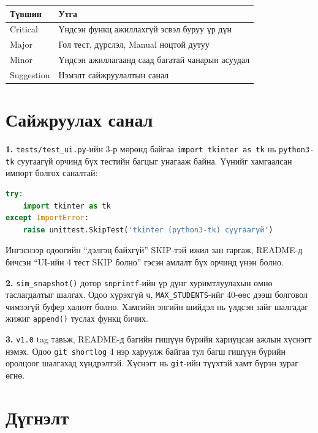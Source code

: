 \documentclass[11pt,a4paper]{article}
\begin{document}
\begin{center}
\small
\begin{tabular}{lL{11.0cm}}
\toprule
Түвшин & Утга \\
\midrule
Critical & Үндсэн функц ажиллахгүй эсвэл буруу үр дүн \\
Major & Гол тест, дүрслэл, Manual ноцтой дутуу \\
Minor & Үндсэн ажиллагаанд саад багатай чанарын асуудал \\
Suggestion & Нэмэлт сайжруулалтын санал \\
\bottomrule
\end{tabular}
\end{center}

\section{Сайжруулах санал}

\textbf{1.} \texttt{tests/test\_ui.py}-ийн 3-р мөрөнд байгаа
\texttt{import tkinter as tk} нь \texttt{python3-tk} суугаагүй орчинд бүх
тестийн багцыг унагааж байна. Үүнийг хамгаалсан импорт болгох саналтай:

\begin{lstlisting}[language=Python]
try:
    import tkinter as tk
except ImportError:
    raise unittest.SkipTest('tkinter (python3-tk) суугаагүй')
\end{lstlisting}

Ингэснээр одоогийн ``дэлгэц байхгүй'' SKIP-тэй ижил зан гаргаж, README-д
бичсэн ``UI-ийн 4 тест SKIP болно'' гэсэн амлалт бүх орчинд үнэн болно.

\vspace{3mm}\textbf{2.} \texttt{sim\_snapshot()} дотор \texttt{snprintf}-ийн
үр дүнг хуримтлуулахын өмнө таслагдалтыг шалгах. Одоо хүрэхгүй ч,
\texttt{MAX\_STUDENTS}-ийг 40-өөс дээш болговол чимээгүй буфер халилт болно.
Хамгийн энгийн шийдэл нь үлдсэн зайг шалгадаг жижиг \texttt{append()}
туслах функц бичих.

\vspace{3mm}\textbf{3.} \texttt{v1.0} tag тавьж, README-д багийн гишүүн
бүрийн хариуцсан ажлын хүснэгт нэмэх. Одоо \texttt{git shortlog} 4 нэр
харуулж байгаа тул багш гишүүн бүрийн оролцоог шалгахад хүндрэлтэй.
Хүснэгт нь \texttt{git}-ийн түүхтэй хамт бүрэн зураг өгнө.

\section{Дүгнэлт}
\end{document}
